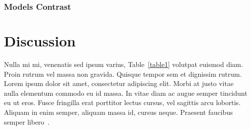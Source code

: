 \documentclass[10pt,letterpaper]{article}
\begin{document}
\subsubsection*{Models Contrast}



\section*{Discussion}
Nulla mi mi, venenatis sed ipsum varius, Table~\ref{table1} volutpat euismod diam. Proin rutrum vel massa non gravida. Quisque tempor sem et dignissim rutrum. Lorem ipsum dolor sit amet, consectetur adipiscing elit. Morbi at justo vitae nulla elementum commodo eu id massa. In vitae diam ac augue semper tincidunt eu ut eros. Fusce fringilla erat porttitor lectus cursus, vel sagittis arcu lobortis. Aliquam in enim semper, aliquam massa id, cursus neque. Praesent faucibus semper libero~\cite{bib3}.
\end{document}
